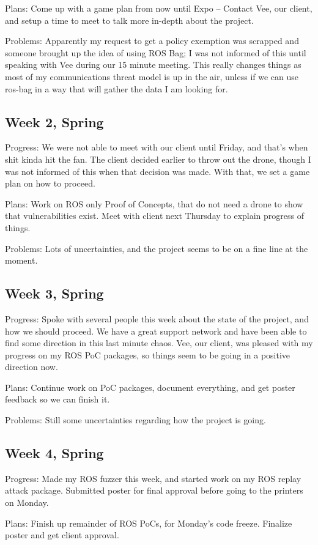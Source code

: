\documentclass[IEEEtran,letterpaper,10pt,notitlepage,draftclsnofoot,onecolumn]{article}
\begin{document}
Plans: Come up with a game plan from now until Expo -- Contact Vee, our client, and setup a time to meet to talk more in-depth about the project.

Problems: Apparently my request to get a policy exemption was scrapped and someone brought up the idea of using ROS Bag; I was not informed of this until speaking with Vee during our 15 minute meeting. This really changes things as most of my communications threat model is up in the air, unless if we can use ros-bag in a way that will gather the data I am looking for.
\subsection{Week 2, Spring}
Progress: We were not able to meet with our client until Friday, and that's when shit kinda hit the fan. The client decided earlier to throw out the drone, though I was not informed of this when that decision was made. With that, we set a game plan on how to proceed.

Plans: Work on ROS only Proof of Concepts, that do not need a drone to show that vulnerabilities exist. Meet with client next Thursday to explain progress of things.

Problems: Lots of uncertainties, and the project seems to be on a fine line at the moment.
\subsection{Week 3, Spring}
Progress: Spoke with several people this week about the state of the project, and how we should proceed. We have a great support network and have been able to find some direction in this last minute chaos. Vee, our client, was pleased with my progress on my ROS PoC packages, so things seem to be going in a positive direction now.

Plans: Continue work on PoC packages, document everything, and get poster feedback so we can finish it.

Problems: Still some uncertainties regarding how the project is going.
\subsection{Week 4, Spring}
Progress: Made my ROS fuzzer this week, and started work on my ROS replay attack package. Submitted poster for final approval before going to the printers on Monday.

Plans: Finish up remainder of ROS PoCs, for Monday's code freeze. Finalize poster and get client approval.
\end{document}
